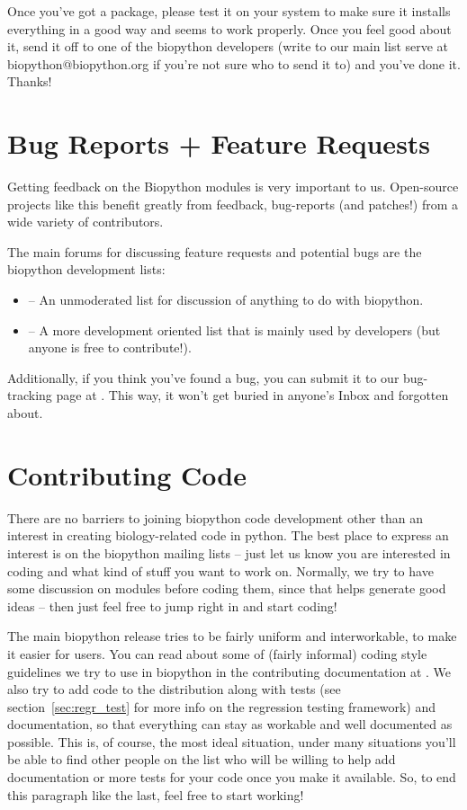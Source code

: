 \documentclass{report}
\begin{document}
Once you've got a package, please test it on your system to make sure it installs everything in a good way and seems to work properly. Once you feel good about it, send it off to one of the biopython developers (write to our main list serve at biopython@biopython.org if you're not sure who to send it to) and you've done it. Thanks!

\section{Bug Reports + Feature Requests}

Getting feedback on the Biopython modules is very important to us. Open-source projects like this benefit greatly from feedback, bug-reports (and patches!) from a wide variety of contributors.


The main forums for discussing feature requests and potential bugs are the biopython development lists:

\begin{itemize}
  \item {} -- An unmoderated list for discussion of anything to do with biopython.

  \item {} -- A more development oriented list that is mainly used by developers (but anyone is free to contribute!).
\end{itemize}

Additionally, if you think you've found a bug, you can submit it to our
bug-tracking page at . This 
way, it won't get buried in anyone's Inbox and forgotten about.

\section{Contributing Code}

There are no barriers to joining biopython code development other than an interest in creating biology-related code in python. The best place to express an interest is on the biopython mailing lists -- just let us know you are interested in coding and what kind of stuff you want to work on. Normally, we try to have some discussion on modules before coding them, since that helps generate good ideas -- then just feel free to jump right in and start coding!


The main biopython release tries to be fairly uniform and interworkable,
to make it easier for users. You can read about some of (fairly
informal) coding style guidelines we try to use in biopython in the
contributing documentation at 
. We also try to add code to the distribution along with tests (see section~\ref{sec:regr_test} for more info on the regression testing framework) and documentation, so that everything can stay as workable and well documented as possible. This is, of course, the most ideal situation, under many situations you'll be able to find other people on the list who will be willing to help add documentation or more tests for your code once you make it available. So, to end this paragraph like the last, feel free to start working!
\end{document}
